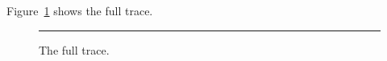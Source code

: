 \documentclass{article}
\begin{document}
Figure~\ref{fig:tall} shows the full trace.
\begin{figure}
  \centering
  \rule{4cm}{15cm}
  \caption{The full trace.}
  \label{fig:tall}
\end{figure}
\end{document}
